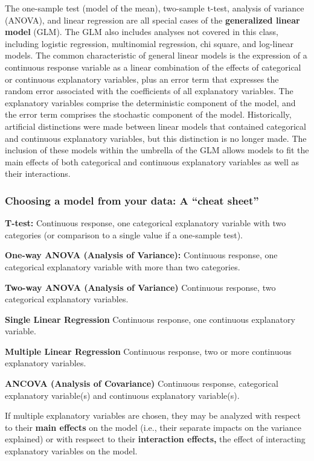 \documentclass[]{article}
\begin{document}
The one-sample test (model of the mean), two-sample t-test, analysis of
variance (ANOVA), and linear regression are all special cases of the
\textbf{generalized linear model} (GLM). The GLM also includes analyses
not covered in this class, including logistic regression, multinomial
regression, chi square, and log-linear models. The common characteristic
of general linear models is the expression of a continuous response
variable as a linear combination of the effects of categorical or
continuous explanatory variables, plus an error term that expresses the
random error associated with the coefficients of all explanatory
variables. The explanatory variables comprise the deterministic
component of the model, and the error term comprises the stochastic
component of the model. Historically, artificial distinctions were made
between linear models that contained categorical and continuous
explanatory variables, but this distinction is no longer made. The
inclusion of these models within the umbrella of the GLM allows models
to fit the main effects of both categorical and continuous explanatory
variables as well as their interactions.

\subsubsection{\texorpdfstring{Choosing a model from your data: A
``cheat
sheet''}{Choosing a model from your data: A cheat sheet}}\label{choosing-a-model-from-your-data-a-cheat-sheet}

\textbf{T-test:} Continuous response, one categorical explanatory
variable with two categories (or comparison to a single value if a
one-sample test).

\textbf{One-way ANOVA (Analysis of Variance):} Continuous response, one
categorical explanatory variable with more than two categories.

\textbf{Two-way ANOVA (Analysis of Variance)} Continuous response, two
categorical explanatory variables.

\textbf{Single Linear Regression} Continuous response, one continuous
explanatory variable.

\textbf{Multiple Linear Regression} Continuous response, two or more
continuous explanatory variables.

\textbf{ANCOVA (Analysis of Covariance)} Continuous response,
categorical explanatory variable(s) and continuous explanatory
variable(s).

If multiple explanatory variables are chosen, they may be analyzed with
respect to their \textbf{main effects} on the model (i.e., their
separate impacts on the variance explained) or with respsect to their
\textbf{interaction effects,} the effect of interacting explanatory
variables on the model.
\end{document}
